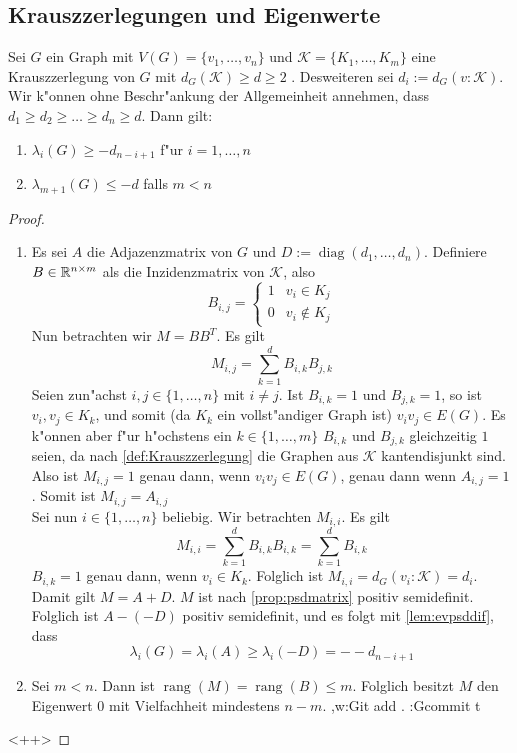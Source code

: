 \subsection{Krauszzerlegungen und Eigenwerte}

\begin{theorem}
  \label{thm:KrauszEigenwerte}
  Sei $G$ ein Graph mit $V(G)=\{v_1,\dots,v_n\}$ und $\mathcal K=\{K_1,\dots,K_m\}$ eine Krauszzerlegung von $G$ mit $d_G(\mathcal K) \geq d \geq 2$ . Desweiteren sei $d_i := d_G(v:\mathcal K)$. 
  Wir k"onnen ohne Beschr"ankung der Allgemeinheit annehmen, dass $d_1\geq d_2 \geq \dots \geq d_n \geq d$.
  Dann gilt: 
  \begin{enumerate}[label=(\alph*)]
    \item $\lambda_i(G) \geq -d_{n-i+1}$ f"ur $i = 1, \dots , n$
    \item $\lambda_{m+1}(G) \leq -d$ falls $m < n$
  \end{enumerate}
\end{theorem}
\begin{proof}
  \begin{enumerate}[label=(\alph*)]
    \item Es sei $A$ die Adjazenzmatrix von $G$ und $D := \operatorname{diag}(d_1,\dots,d_n)$. Definiere $B\in{\mathbb{R}}^{n\times m}$ als die Inzidenzmatrix von $\mathcal K$, also $$B_{i,j} = \begin{cases}
        1 & v_i \in K_j \\ 0 & v_i \notin K_j
      \end{cases}$$ 
      Nun betrachten wir $M=BB^{T}$. Es gilt
      \[
        M_{i,j} = \sum\limits_{k=1}^{d}B_{i,k}B_{j,k}
      \]
      Seien zun"achst $i,j \in \{1,\dots,n\}$ mit $i\neq j$. Ist $B_{i,k} = 1$ und $B_{j,k} = 1$, so ist $v_i,v_j  \in K_k$, und somit (da $K_k$ ein vollst"andiger Graph ist) $v_iv_j\in E(G)$. Es k"onnen aber f"ur h"ochstens ein $k\in \{1,\dots,m\}$ $B_{i,k}$ und $B_{j,k}$ gleichzeitig $1$ seien, da nach \ref{def:Krauszzerlegung} die Graphen aus $\mathcal K$ kantendisjunkt sind. Also ist $M_{i,j}= 1 $ genau dann, wenn $v_iv_j\in E(G)$, genau dann wenn $A_{i,j} = 1$. Somit ist $M_{i,j}=A_{i,j}$\\
      Sei nun $i\in\{1,\dots,n\}$ beliebig. Wir betrachten $M_{i,i}$. Es gilt 
      \[
        M_{i,i} = \sum\limits_{k=1}^{d}B_{i,k}B_{i,k} = \sum\limits_{k=1}^{d} B_{i,k}
      \]
      $B_{i,k}=1$ genau dann, wenn $v_i \in K_k$. Folglich ist $M_{i,i}= d_G(v_i:\mathcal K)= d_i$. Damit gilt $M=A+D$. $M$ ist nach \ref{prop:psdmatrix} positiv semidefinit.
      Folglich ist $A- (-D)$ positiv semidefinit, und es folgt mit \ref{lem:evpsddif}, dass 
      \begin{equation*}
        \lambda_i(G) = \lambda_i(A) \geq \lambda_i(-D) =- -d_{n-i+1}
      \end{equation*}
    \item Sei $m<n$. Dann ist $\operatorname{rang}(M)= \operatorname{rang}(B) \leq m$. Folglich besitzt $M$ den Eigenwert $0$ mit Vielfachheit mindestens $n-m$. ,w:Git add .
      :Gcommit
t


  \end{enumerate}<++>
\end{proof}
